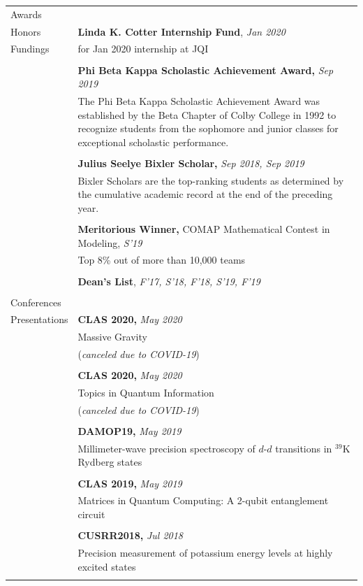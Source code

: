 \documentclass[10pt]{article}
\begin{document}
\begin{longtable}{ l m{13.5cm}   }
  \large{Awards}    	& \\
  \large{Honors}		& \textbf{Linda K. Cotter Internship Fund}, \textit{Jan 2020}\\
  \large{Fundings}		& for Jan 2020 internship at JQI\\
  						&\\
						& \textbf{Phi Beta Kappa Scholastic Achievement Award,} \textit{Sep 2019}\\
  						& The Phi Beta Kappa Scholastic Achievement Award was established by the Beta Chapter of Colby College in 1992 to recognize students from the sophomore and junior classes for exceptional scholastic performance.\\
  						&\\
     				 	& \textbf{Julius Seelye Bixler Scholar,} \textit{Sep 2018, Sep 2019}\\
     				 	& Bixler Scholars are the top-ranking students as determined by the cumulative academic record at the end of the preceding year.\\
     				 	&\\
     				 	& \textbf{Meritorious Winner,}  COMAP Mathematical Contest in Modeling, \textit{S'19}\\
     				 	& Top 8\% out of more than 10,000 teams\\
     				 	&\\
     				 	& \textbf{Dean’s List}, \textit{F'17, S'18, F'18, S'19, F'19}\\
     				 	&\\
     				 	 
  \large{Conferences}   & \\
  \large{Presentations}	& \textbf{CLAS 2020,} \textit{May 2020}\\
  						& Massive Gravity\\
  						& (\textit{canceled due to COVID-19})\\
  						& \\
  						& \textbf{CLAS 2020,} \textit{May 2020}\\
  						& Topics in Quantum Information\\
  						& (\textit{canceled due to COVID-19})\\
  						& \\
  						& \textbf{DAMOP19,} \textit{May 2019} \\
  						& Millimeter-wave precision spectroscopy of $d$-$d$ transitions in $^{\text{39}}$K Rydberg states\\
  						& \\
  						& \textbf{CLAS 2019,} \textit{May 2019}\\
  						& Matrices in Quantum Computing: A 2-qubit entanglement circuit\\
  						&\\
  						& \textbf{CUSRR2018,} \textit{Jul 2018}\\
  						& Precision measurement of potassium energy levels at highly excited states\\
  	 					& \\ 
 


\end{longtable}
\end{document}

